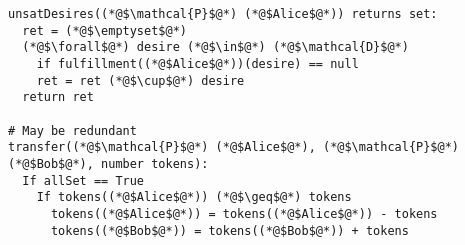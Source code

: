 \begin{lstlisting}[label=satfunc, style=numbers]
unsatDesires((*@$\mathcal{P}$@*) (*@$Alice$@*)) returns set:
  ret = (*@$\emptyset$@*)
  (*@$\forall$@*) desire (*@$\in$@*) (*@$\mathcal{D}$@*)
    if fulfillment((*@$Alice$@*))(desire) == null
    ret = ret (*@$\cup$@*) desire
  return ret

# May be redundant
transfer((*@$\mathcal{P}$@*) (*@$Alice$@*), (*@$\mathcal{P}$@*) (*@$Bob$@*), number tokens):
  If allSet == True
    If tokens((*@$Alice$@*)) (*@$\geq$@*) tokens
      tokens((*@$Alice$@*)) = tokens((*@$Alice$@*)) - tokens
      tokens((*@$Bob$@*)) = tokens((*@$Bob$@*)) + tokens
\end{lstlisting}

